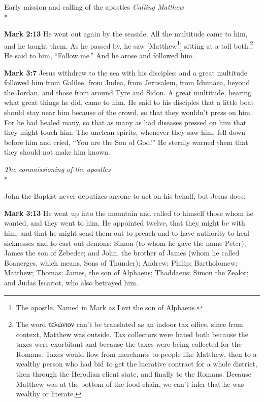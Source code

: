 \documentclass[10pt,twoside]{article} %
\newcommand{\quotesize}{\normalsize{}}
\newcommand{\comm}[1]{\begingroup \color{black!50} #1\endgroup}
\newenvironment{quotetext}{\begingroup\quotesize}{\endgroup}
\newcommand{\intex}[1]{\index[texts]{#1}}
\newcommand{\bible}[2]{\begin{quotetext}\textbf{#1}\intex{#1} #2\end{quotetext}}
\newcommand{\gospelmark}[2]{\bible{Mark #1}{#2}}
\newcommand{\subhead}[1]{\emph{#1}\\*}
\begin{document}
\begin{section}{Early mission and calling of the apostles}
\subhead{Calling Matthew}

\gospelmark{2:13}{He went out again by the seaside. All the multitude came to him, and he taught them.   As he passed by, he saw 
[Matthew\footnote{The apostle. Named in Mark as Levi the son of Alphaeus.}] sitting at a 
toll both.\footnote{The word τελώνιον can't be translated as an indoor tax office, since from context, Matthew was outside.
Tax collectors were hated
both because the taxes were exorbitant and because the taxes were being collected for the Romans. Taxes would flow from merchants
to people like Matthew, then to a wealthy person who had bid to get the lucrative contract for a whole district, then through
the Herodian client state, and finally to the Romans.
Because Matthew was at the bottom of the food chain, we can't infer that he was wealthy or literate.}\index{tax collectors}
He said to him, ``Follow me.'' And he arose and followed him.}


\gospelmark{3:7}{
  Jesus withdrew to the sea with his disciples; and a great multitude followed him from Galilee, from Judea,   from Jerusalem, from Idumaea, beyond the Jordan, and those from around Tyre and Sidon. A great multitude, hearing what great things he did, came to him.   He said to his disciples that a little boat should stay near him because of the crowd, so that they wouldn't press on him.   For he had healed many, so that as many as had diseases pressed on him that they might touch him.   The unclean spirits, whenever they saw him, fell down before him and cried, ``You are the Son of God!''   He sternly warned them that they should not make him known.
}

\subhead{The commissioning of the apostles}

\comm{
John the Baptist never deputizes anyone to act on his behalf, but Jesus does:
}

\gospelmark{3:13}{
  He went up into the mountain and called to himself those whom he wanted, and they went to him.   He appointed twelve, that they might be with him, and that he might send them out to preach   and to have authority to heal sicknesses and to cast out demons:   Simon (to whom he gave the name Peter);   James the son of Zebedee; and John, the brother of James (whom he called Boanerges, which means, Sons of Thunder);   Andrew; Philip; Bartholomew; Matthew; Thomas; James, the son of Alphaeus; Thaddaeus; Simon the Zealot;   and Judas Iscariot, who also betrayed him.\index{apostles!list}
}


\end{section}
\end{document}

